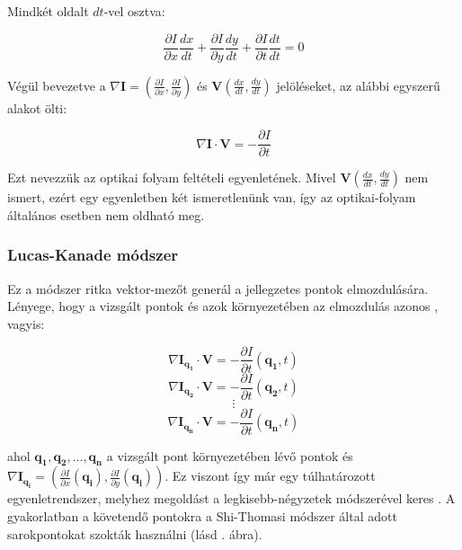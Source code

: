 Mindkét oldalt $dt$-vel osztva:

\[\frac{\partial I}{\partial x} \frac{dx}{dt} + \frac{\partial I}{\partial y} \frac{dy}{dt} + \frac{\partial I}{\partial t} \frac{dt}{dt} = 0\]

Végül bevezetve a $\nabla \mathbf{I} = \left(\frac{\partial I}{\partial x}, \frac{\partial I}{\partial y}\right)$ és $\mathbf{V}\left(\frac{dx}{dt}, \frac{dy}{dt}\right)$ jelöléseket, az alábbi egyszerű alakot ölti:

\[\nabla \mathbf{I} \cdot \mathbf{V} = -\frac{\partial I}{\partial t}\]

Ezt nevezzük az optikai folyam feltételi egyenletének. Mivel $\mathbf{V}\left(\frac{dx}{dt}, \frac{dy}{dt}\right)$ nem ismert, ezért egy egyenletben két ismeretlenünk van, így az optikai-folyam általános esetben nem oldható meg.

\subsubsection{Lucas-Kanade módszer \cite{LK}}

Ez a módszer ritka vektor-mezőt generál a jellegzetes pontok elmozdulására. Lényege, hogy a vizsgált pontok és azok környezetében az elmozdulás azonos \cite{lk-wiki}, vagyis:

\[\nabla \mathbf{I}_{\mathbf{q_1}} \cdot \mathbf{V} = -\frac{\partial I}{\partial t}(\mathbf{q_1}, t)\]
\[\nabla \mathbf{I}_{\mathbf{q_2}} \cdot \mathbf{V} = -\frac{\partial I}{\partial t}(\mathbf{q_2}, t)\]
\[\vdots\]
\[\nabla \mathbf{I}_{\mathbf{q_n}} \cdot \mathbf{V} = -\frac{\partial I}{\partial t}(\mathbf{q_n}, t)\]

ahol $\mathbf{q_1},\mathbf{q_2},\ldots,\mathbf{q_n}$ a vizsgált pont környezetében lévő pontok és $\nabla \mathbf{I}_{\mathbf{q_i}} = \left(\frac{\partial I}{\partial x}(\mathbf{q_i}), \frac{\partial I}{\partial y}(\mathbf{q_i})\right)$. Ez viszont így már egy túlhatározott egyenletrendszer, melyhez megoldást a legkisebb-négyzetek módszerével keres \cite{LK, lk-wiki}. A gyakorlatban a követendő pontokra a Shi-Thomasi \cite{shi-thomasi} módszer által adott sarokpontokat szokták használni (lásd . ábra).


